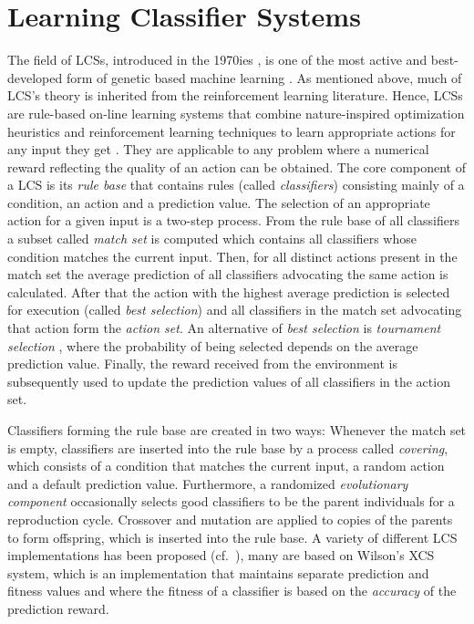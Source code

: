 \section{Learning Classifier Systems}
\label{section:learning-classifier-systems}

The field of LCSs, introduced in the 1970ies \cite{Hol75,Hol76,HR78}, is one of the most active and best-developed form of genetic based machine learning \cite{Kov02a,KL00,Lan08}. As mentioned above, much of LCS's theory is inherited from the reinforcement learning literature. %
Hence, LCSs are rule-based on-line learning systems that combine nature-inspired optimization heuristics and reinforcement learning techniques to learn appropriate actions for any input they get \cite{Wil95}. They are applicable to any problem where a numerical reward reflecting the quality of an action can be obtained. The core component of a LCS is its \emph{rule base} that contains rules (called \emph{classifiers}) consisting mainly of a condition, an action and a prediction value. The selection of an appropriate action for a given input is a two-step process. From the rule base of all classifiers a subset called \emph{match set} is computed which contains all classifiers whose condition matches the current input. Then, for all distinct actions present in the match set the average prediction of all classifiers advocating the same action is calculated. After that the action with the highest average prediction is selected for execution (called \emph{best selection}) and all classifiers in the match set advocating that action form the \emph{action set}. An alternative of \emph{best selection} is \emph{tournament selection} \cite{Butz2003}, where the probability of being selected depends on the average prediction value. Finally, the reward received from the environment is subsequently used to update the prediction values of all classifiers in the action set.

Classifiers forming the rule base are created in two ways: Whenever the match set is empty, classifiers are inserted into the rule base by a process called \emph{covering}, which consists of a condition that matches the current input, a random action and a default prediction value. Furthermore, a randomized \emph{evolutionary component} occasionally selects %
good classifiers to be the parent individuals for a reproduction cycle. Crossover and mutation are applied to copies of the parents to form offspring, which is inserted into the rule base. A variety of different LCS implementations has been proposed (cf.~\cite{Kov02a}), many are based on Wilson's XCS \cite{Wil95} system, which is an implementation that maintains separate prediction and fitness values and where the fitness of a classifier is based on the \emph{accuracy} of the prediction reward.  

